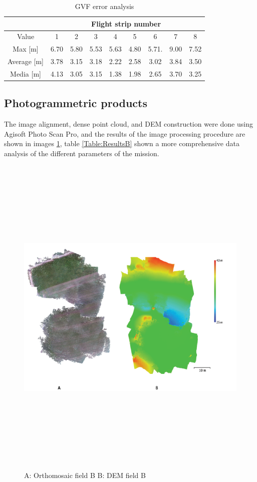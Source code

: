 \begin{table}[H]
\centering
\begin{tabular}{|c|c|c|c|c|c|c|c|c|}
\hline
                & \multicolumn{8}{c|}{Flight strip number}               \\ \hline
Value           & 1    & 2    & 3    & 4    & 5    & 6     & 7    & 8    \\ \hline
Max {[}m{]}     & 6.70 & 5.80 & 5.53 & 5.63 & 4.80 & 5.71. & 9.00 & 7.52 \\ \hline
Average {[}m{]} & 3.78 & 3.15 & 3.18 & 2.22 & 2.58 & 3.02  & 3.84 & 3.50 \\ \hline
Media {[}m{]}   & 4.13 & 3.05 & 3.15 & 1.38 & 1.98 & 2.65  & 3.70 & 3.25 \\ \hline
\end{tabular}
\caption{GVF error analysis}
\label{Table:errorGVF}
\end{table}

\subsection{Photogrammetric products}
The image alignment, dense point cloud, and DEM construction were done using Agisoft Photo Scan Pro, and the results of the image processing procedure are shown in images \ref{fig:ResultBprocessing}, table \ref{Table:ResultsB} shown a more comprehensive data analysis of the different parameters of the mission.
\begin{figure}[H]
\centering
\includegraphics[width=16cm,height=16cm,keepaspectratio]{imagenes/ResutsB.png}
\caption{ A: Orthomosaic field B B: DEM field B}
\label{fig:ResultBprocessing}
\end{figure}


